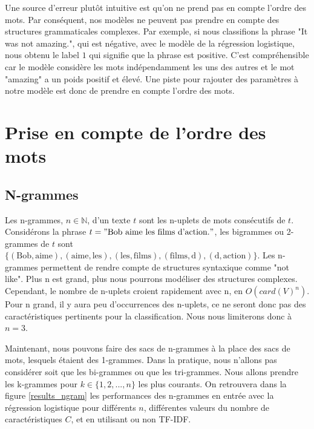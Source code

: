 \documentclass{article}
\begin{document}
Une source d'erreur plutôt intuitive est qu'on ne prend pas en compte l'ordre des mots. Par conséquent, nos modèles ne peuvent pas prendre en compte des structures grammaticales complexes. Par exemple, si nous classifions la phrase "It was not amazing.", qui est négative, avec le modèle de la régression logistique, nous obtenu le label $1$ qui signifie que la phrase est positive. C'est compréhensible car le modèle considère les mots indépendamment les uns des autres et le mot "amazing" a un poids positif et élevé. Une piste pour rajouter des paramètres à notre modèle est donc de prendre en compte l'ordre des mots.  

\clearpage

\section{Prise en compte de l'ordre des mots}

\subsection{N-grammes}

Les n-grammes, $n \in \mathbb{N}$, d'un texte $t$ sont les n-uplets de mots consécutifs de $t$. Considérons la phrase $t="\text{Bob aime les films d'action.}"$, les bigrammes ou 2-grammes de $t$ sont $\{(\text{Bob}, \text{aime}), (\text{aime}, \text{les}), (\text{les}, \text{films}), (\text{films}, \text{d}), (\text{d}, \text{action})\}$. Les n-grammes permettent de rendre compte de structures syntaxique comme "not like". Plus n est grand, plus nous pourrons modéliser des structures complexes. Cependant, le nombre de n-uplets croient rapidement avec n, en $O(card(V)^{n})$. Pour n grand, il y aura peu d’occurrences des n-uplets, ce ne seront donc pas des caractéristiques pertinents pour la classification. Nous nous limiterons donc à $n = 3$.

Maintenant, nous pouvons faire des sacs de n-grammes à la place des sacs de mots, lesquels étaient des 1-grammes. Dans la pratique, nous n'allons pas considérer soit que les bi-grammes ou que les tri-grammes. Nous allons prendre les k-grammes pour $k \in \{1, 2, ..., n\}$ les plus courants. On retrouvera dans la figure \ref{results_ngram} les performances des n-grammes en entrée avec la régression logistique pour différents $n$, différentes valeurs du nombre de caractéristiques $C$, et en utilisant ou non TF-IDF. 
\end{document}
